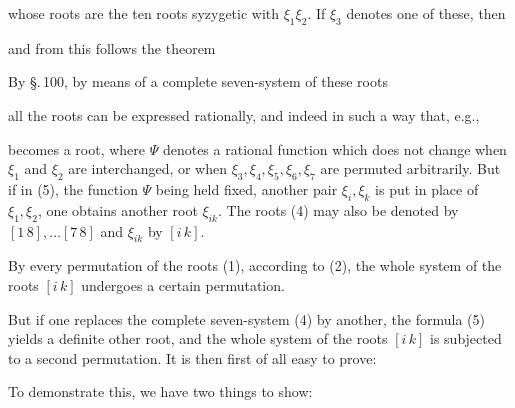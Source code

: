 whose roots are the ten roots syzygetic with $\xi_1\xi_2$. If $\xi_3$ denotes one of these, then


and from this follows the theorem


By \S.\,100, by means of a complete seven-system of these roots


all the roots can be expressed rationally, and indeed in such a way that, e.g.,


becomes a root, where $\Psi$ denotes a rational function which does not change when $\xi_1$ and $\xi_2$ are interchanged, or when $\xi_3,\xi_4,\xi_5,\xi_6,\xi_7$ are permuted arbitrarily. But if in (5), the function $\Psi$ being held fixed, another pair $\xi_i,\xi_k$ is put in place of $\xi_1,\xi_2$, one obtains another root $\xi_{ik}$. The roots (4) may also be denoted by $[1\,8],\dots[7\,8]$ and $\xi_{ik}$ by $[i\,k]$.

By every permutation of the roots (1), according to (2), the whole system of the roots $[i\,k]$ undergoes a certain permutation.

But if one replaces the complete seven-system (4) by another, the formula (5) yields a definite other root, and the whole system of the roots $[i\,k]$ is subjected to a second permutation. It is then first of all easy to prove:


To demonstrate this, we have two things to show:
